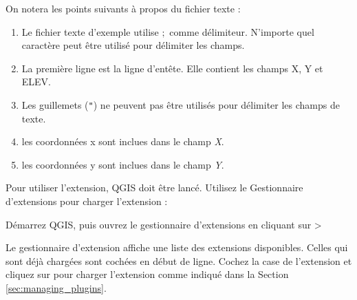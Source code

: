 On notera les points suivants à propos du fichier texte :

\begin{enumerate}
\item Le fichier texte d'exemple utilise \mbox{$;$} comme délimiteur. N'importe quel caractère peut être utilisé pour délimiter les champs.
\item La première ligne est la ligne d'entête. Elle contient les champs X, Y et ELEV.
\item Les guillemets ({\tt{}"{}}) ne peuvent pas être utilisés pour délimiter les champs de texte.
\item les coordonnées x sont inclues dans le champ {\em X}.
\item les coordonnées y sont inclues dans le champ {\em Y}.
\end{enumerate}

Pour utiliser l'extension, QGIS doit être lancé. Utilisez le Gestionnaire d'extensions pour charger l'extension : 

Démarrez QGIS, puis ouvrez le gestionnaire d'extensions en cliquant sur  > 

Le gestionnaire d'extension affiche une liste des extensions disponibles.
Celles qui sont déjà chargées sont cochées en début de ligne.
Cochez la case de l'extension  et cliquez sur  pour charger l'extension comme indiqué dans la Section \ref{sec:managing_plugins}.

